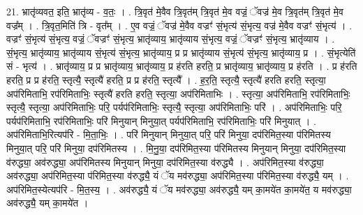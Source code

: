 \documentclass[17pt]{extarticle}
\begin{document}
21. भ्रातृ॑व्यवत॒ इति॒ भ्रातृ॑व्य - व॒तः॒ । . त्रि॒वृत॑ मे॒वैव त्रि॒वृत॑म् त्रि॒वृत॑ मे॒व वज्रं॒ ॅवज्र॑ मे॒व त्रि॒वृत॑म् त्रि॒वृत॑ मे॒व वज्र᳚म् । . त्रि॒वृत॒मिति॑ त्रि - वृत᳚म् । . ए॒व वज्रं॒ ॅवज्र॑ मे॒वैव वज्रꣳ॑ सं॒भृत्य॑ सं॒भृत्य॒ वज्र॑ मे॒वैव वज्रꣳ॑ सं॒भृत्य॑ । . वज्रꣳ॑ सं॒भृत्य॑ सं॒भृत्य॒ वज्रं॒ ॅवज्रꣳ॑ सं॒भृत्य॒ भ्रातृ॑व्याय॒ भ्रातृ॑व्याय सं॒भृत्य॒ वज्रं॒ ॅवज्रꣳ॑ सं॒भृत्य॒ भ्रातृ॑व्याय । . सं॒भृत्य॒ भ्रातृ॑व्याय॒ भ्रातृ॑व्याय सं॒भृत्य॑ सं॒भृत्य॒ भ्रातृ॑व्याय॒ प्र प्र भ्रातृ॑व्याय सं॒भृत्य॑ सं॒भृत्य॒ भ्रातृ॑व्याय॒ प्र । . सं॒भृत्येति॑ सं - भृत्य॑ । . भ्रातृ॑व्याय॒ प्र प्र भ्रातृ॑व्याय॒ भ्रातृ॑व्याय॒ प्र ह॑रति हरति॒ प्र भ्रातृ॑व्याय॒ भ्रातृ॑व्याय॒ प्र ह॑रति । . प्र ह॑रति हरति॒ प्र प्र ह॑रति॒ स्तृत्यै॒ स्तृत्यै॑ हरति॒ प्र प्र ह॑रति॒ स्तृत्यै᳚ । . ह॒र॒ति॒ स्तृत्यै॒ स्तृत्यै॑ हरति हरति॒ स्तृत्या॒ अप॑रिमिताभि॒ रप॑रिमिताभिः॒ स्तृत्यै॑ हरति हरति॒ स्तृत्या॒ अप॑रिमिताभिः । . स्तृत्या॒ अप॑रिमिताभि॒ रप॑रिमिताभिः॒ स्तृत्यै॒ स्तृत्या॒ अप॑रिमिताभिः॒ परि॒ पर्यप॑रिमिताभिः॒ स्तृत्यै॒ स्तृत्या॒ अप॑रिमिताभिः॒ परि॑ । . अप॑रिमिताभिः॒ परि॒ पर्यप॑रिमिताभि॒ रप॑रिमिताभिः॒ परि॑ मिनुयान् मिनुया॒त् पर्यप॑रिमिताभि॒ रप॑रिमिताभिः॒ परि॑ मिनुयात् । . अप॑रिमिताभि॒रित्यप॑रि - मि॒ता॒भिः॒ । . परि॑ मिनुयान् मिनुया॒त् परि॒ परि॑ मिनुया॒ दप॑रिमित॒स्या प॑रिमितस्य मिनुया॒त् परि॒ परि॑ मिनुया॒ दप॑रिमितस्य । . मि॒नु॒या॒ दप॑रिमित॒स्या प॑रिमितस्य मिनुयान् मिनुया॒ दप॑रिमित॒स्या व॑रुद्ध्या॒ अव॑रुद्ध्या॒ अप॑रिमितस्य मिनुयान् मिनुया॒ दप॑रिमित॒स्या व॑रुद्ध्यै । . अप॑रिमित॒स्या व॑रुद्ध्या॒ अव॑रुद्ध्या॒ अप॑रिमित॒स्या प॑रिमित॒स्या व॑रुद्ध्यै॒ यं ॅय मव॑रुद्ध्या॒ अप॑रिमित॒स्या प॑रिमित॒स्या व॑रुद्ध्यै॒ यम् । . अप॑रिमित॒स्येत्यप॑रि - मि॒त॒स्य॒ । . अव॑रुद्ध्यै॒ यं ॅय मव॑रुद्ध्या॒ अव॑रुद्ध्यै॒ यम् का॒मये॑त का॒मये॑त॒ य मव॑रुद्ध्या॒ अव॑रुद्ध्यै॒ यम् का॒मये॑त । \newline
\end{document}
